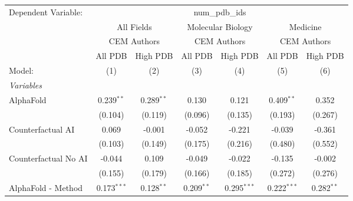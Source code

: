\begingroup
\centering
\begin{tabular}{lcccccc}
   \tabularnewline \midrule \midrule
   Dependent Variable: & \multicolumn{6}{c}{num\_pdb\_ids}\\
 & \multicolumn{2}{c}{All Fields} & \multicolumn{2}{c}{Molecular Biology} & \multicolumn{2}{c}{Medicine} \\
\cmidrule(lr){2-3} \cmidrule(lr){4-5} \cmidrule(lr){6-7}
 & \multicolumn{2}{c}{CEM Authors} & \multicolumn{2}{c}{CEM Authors} & \multicolumn{2}{c}{CEM Authors} \\
\cmidrule(lr){2-3} \cmidrule(lr){4-5} \cmidrule(lr){6-7}
 & \multicolumn{1}{c}{All PDB} & \multicolumn{1}{c}{High PDB} & \multicolumn{1}{c}{All PDB} & \multicolumn{1}{c}{High PDB} & \multicolumn{1}{c}{All PDB} & \multicolumn{1}{c}{High PDB} \\
\cmidrule(lr){2-2} \cmidrule(lr){3-3} \cmidrule(lr){4-4} \cmidrule(lr){5-5} \cmidrule(lr){6-6} \cmidrule(lr){7-7}
   Model:                                                     & (1)            & (2)            & (3)            & (4)            & (5)            & (6)\\  
   \midrule
   \emph{Variables}\\
   AlphaFold                                                  & 0.239$^{**}$   & 0.289$^{**}$   & 0.130          & 0.121          & 0.409$^{**}$   & 0.352\\   
                                                              & (0.104)        & (0.119)        & (0.096)        & (0.135)        & (0.193)        & (0.267)\\   
   Counterfactual AI                                          & 0.069          & -0.001         & -0.052         & -0.221         & -0.039         & -0.361\\   
                                                              & (0.103)        & (0.149)        & (0.175)        & (0.216)        & (0.480)        & (0.552)\\   
   Counterfactual No AI                                       & -0.044         & 0.109          & -0.049         & -0.022         & -0.135         & -0.002\\   
                                                              & (0.155)        & (0.179)        & (0.166)        & (0.185)        & (0.272)        & (0.276)\\   
   AlphaFold - Method                                         & 0.173$^{***}$  & 0.128$^{**}$   & 0.209$^{**}$   & 0.295$^{***}$  & 0.222$^{***}$  & 0.282$^{**}$\\   

\end{tabular}
